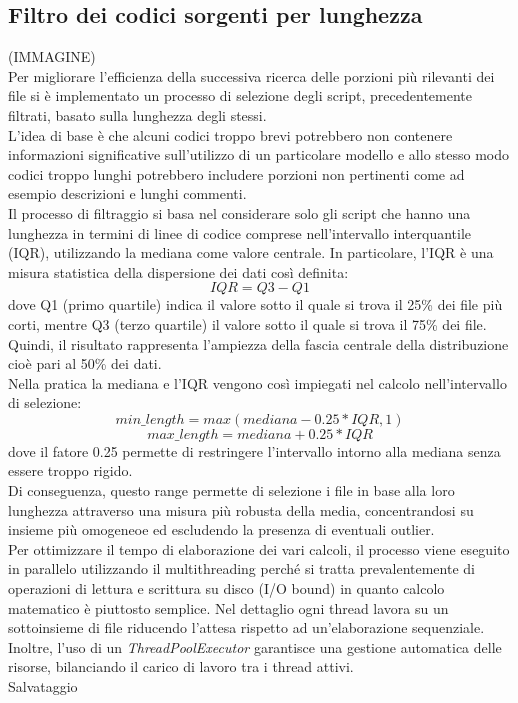 \documentclass{article}
\begin{document}
\subsection{Filtro dei codici sorgenti per lunghezza}
(IMMAGINE)\\
Per migliorare l'efficienza della successiva ricerca delle porzioni più rilevanti dei file si è implementato un processo di selezione degli script, precedentemente filtrati, basato sulla lunghezza degli stessi.\\
L'idea di base è che alcuni codici troppo brevi potrebbero non contenere informazioni significative sull'utilizzo di un particolare modello e allo stesso modo codici troppo lunghi potrebbero includere porzioni non pertinenti come ad esempio descrizioni e lunghi commenti.\\
Il processo di filtraggio si basa nel considerare solo gli script che hanno una lunghezza in termini di linee di codice comprese nell'intervallo interquantile (IQR), utilizzando la mediana come valore centrale. In particolare, l'IQR è una misura statistica della dispersione dei dati così definita:
\[
IQR = Q3 - Q1
\]
dove Q1 (primo quartile) indica il valore sotto il quale si trova il 25\% dei file più corti, mentre Q3 (terzo quartile) il valore sotto il quale si trova il 75\% dei file. Quindi, il risultato rappresenta l'ampiezza della fascia centrale della distribuzione cioè pari al 50\% dei dati.\\
Nella pratica la mediana e l'IQR vengono così impiegati nel calcolo nell'intervallo di selezione:
\[
min\_length =max(mediana-0.25*IQR,1)
\]
\[
max\_length =mediana+0.25*IQR
\]
dove il fatore 0.25 permette di restringere l'intervallo intorno alla mediana senza essere troppo rigido.\\
Di conseguenza, questo range permette di selezione i file in base alla loro lunghezza attraverso una misura più robusta della media, concentrandosi su insieme più omogeneoe ed escludendo la presenza di eventuali outlier.\\
Per ottimizzare il tempo di elaborazione dei vari calcoli, il processo viene eseguito in parallelo utilizzando il multithreading perché si tratta prevalentemente di operazioni di lettura e scrittura su disco (I/O bound) in quanto calcolo matematico è piuttosto semplice. Nel dettaglio ogni thread lavora su un sottoinsieme di file riducendo l'attesa rispetto ad un'elaborazione sequenziale. Inoltre, l'uso di un \textit{ThreadPoolExecutor}\cite{python-concurrent-futures} garantisce una gestione automatica delle risorse, bilanciando il carico di lavoro tra i thread attivi.\\
Salvataggio
\end{document}
